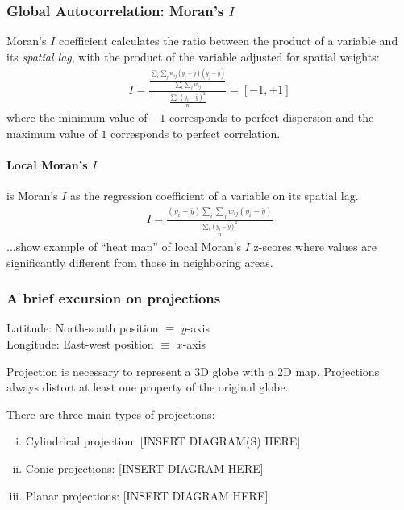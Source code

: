 \subsubsection{Global Autocorrelation: Moran's $I$}

Moran's $I$ coefficient calculates the ratio between the product of a variable and its \emph{spatial lag}, with the product  of the variable adjusted for spatial weights:
\begin{eqnarray}
I = \frac
         {\frac
               {\sum_{i}\sum_{j}w_{ij}(y_{i}-\bar{y})(y_{j}-\bar{y})}
               {\sum_{i}\sum_{j}w_{ij}}
         }
         {\frac
               {\sum_{i}{(y_{i}-\bar{y})^2}}
               {n}
         }
  = [-1, +1]
\end{eqnarray}
\noindent where the minimum value of $-1$ corresponds to perfect dispersion and the maximum value of $1$ corresponds to perfect correlation.

\paragraph{Local Moran's $I$} is Moran's $I$ as the regression coefficient of a variable on its spatial lag.
\begin{eqnarray}
I = \frac
         {(y_{i}-\bar{y})\sum_{i}\sum_{j}w_{ij}(y_{i}-\bar{y})}
         {\frac
               {\sum_{i}{(y_{i}-\bar{y})^2}}
               {n}
         }
\end{eqnarray}
\noindent ...show example of ``heat map'' of local Moran's $I$ z-scores where values are significantly different from those in neighboring areas.

\subsubsection{A brief excursion on projections}

Latitude: North-south position $\equiv$ $y$-axis \\
Longitude: East-west position $\equiv$ $x$-axis

Projection is necessary to represent a 3D globe with a 2D map. Projections always distort at least one property of the original globe.

There are three main types of projections:
\begin{enumerate}[(i)]
\item Cylindrical projection: [INSERT DIAGRAM(S) HERE]
\item Conic projections: [INSERT DIAGRAM HERE]
\item Planar projections: [INSERT DIAGRAM HERE]
\end{enumerate}

